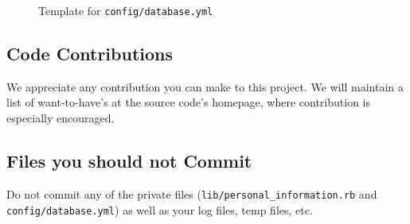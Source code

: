 \documentclass[12pt]{article}
\begin{document}
\begin{figure}[htp]
\centering

\caption{Template for \texttt{config/database.yml}}
\label{code:database.yml}
\end{figure}

\subsection{Code Contributions}

We appreciate any contribution you can make to this project. We will maintain a list of want-to-have's at the source code's homepage, where contribution is especially encouraged.

\subsection{Files you should not Commit}

Do not commit any of the private files (\texttt{lib/personal\_information.rb} and \texttt{config/database.yml}) as well as your log files, temp files, etc.



\end{document}
